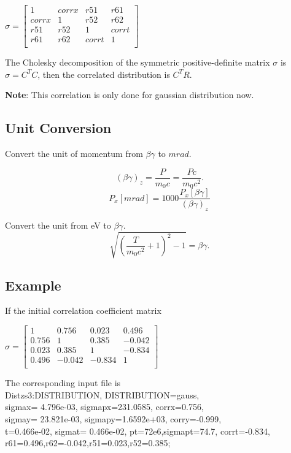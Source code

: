 \documentclass{article}
\begin{document}
$\sigma= \left[
\begin{array}{cccc}
1    &corrx&r51    &r61\\
corrx&1    &r52    &r62\\
r51  &r52  &1      &corrt\\
r61  &r62  &corrt  &1\\

\end{array}
\right]$

 The Cholesky decomposition of the symmetric
positive-definite matrix $\sigma$ is $\sigma=C^TC$, then the
 correlated distribution is $C^TR$.

\textbf{Note}: This correlation is only done for gaussian distribution now.

\subsection{Unit Conversion}
Convert the unit of momentum from $\beta \gamma$ to
$mrad$.

\begin{equation}
\label{eq:betagamma1}
(\beta\gamma)_z=\frac{P}{m_0c}=\frac{Pc}{m_0c^2}.
\end{equation}
\begin{equation}
\label{eq:betagamma2} P_x[
mrad]=1000\frac{P_x[\beta\gamma]}{(\beta\gamma)_z}
\end{equation}

Convert the unit from eV to $\beta\gamma$.
\begin{equation}
\label{eq:eVtobetagamma}
\sqrt{(\frac{T}{m_0c^2}+1)^2-1}=\beta\gamma.
\end{equation}


\subsection{Example}
If the initial  correlation coefficient matrix

$\sigma= \left[
\begin{array}{cccc}
1      &0.756  &0.023    &0.496\\
0.756  &1      &0.385    &-0.042\\
0.023  &0.385  &1        &-0.834\\
0.496  &-0.042 &-0.834   &1\\

\end{array}
\right]$

The corresponding input file is\\
Distzs3:DISTRIBUTION, DISTRIBUTION=gauss,\\
sigmax= 4.796e-03, sigmapx=231.0585, corrx=0.756,\\
sigmay=  23.821e-03, sigmapy=1.6592e+03, corry=-0.999,\\
t=0.466e-02, sigmat=  0.466e-02, pt=72e6,sigmapt=74.7, corrt=-0.834,\\
r61=0.496,r62=-0.042,r51=0.023,r52=0.385;
\end{document}
